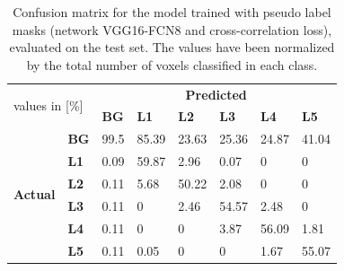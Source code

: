 \begin{table}
 

\begin{tabular}{cl|llllll}
    \toprule
    \multicolumn{2}{l|}{\multirow{2}{*}{values in {[}\%{]}}} & \multicolumn{6}{c}{\textbf{Predicted}}                                            \\
    \multicolumn{2}{l|}{}                                    & \textbf{BG} & \textbf{L1} & \textbf{L2} & \textbf{L3} & \textbf{L4} & \textbf{L5} \\ \hline
    \multirow{6}{*}{\textbf{Actual}}      & \textbf{BG}      & 99.5        & 85.39        & 23.63        & 25.36        & 24.87        & 41.04        \\
     & \textbf{L1} & 0.09 & 59.87 & 2.96  & 0.07  & 0  & 0    \\
     & \textbf{L2} & 0.11 & 5.68  & 50.22 & 2.08  & 0  & 0    \\
     & \textbf{L3} & 0.11 & 0    & 2.46  & 54.57 & 2.48  & 0    \\
     & \textbf{L4} & 0.11 & 0    & 0    & 3.87    & 56.09 & 1.81  \\
     & \textbf{L5} & 0.11 & 0.05    & 0    & 0    & 1.67  & 55.07 \\ \bottomrule
    \end{tabular}

    \caption{Confusion matrix for the model trained with pseudo label masks (network VGG16-FCN8 and cross-correlation loss), evaluated on the test set.
    The values have been normalized by the total number of voxels classified in each class.
    \label{tab:pseudo_confusionMatrix}
    }
\end{table}


